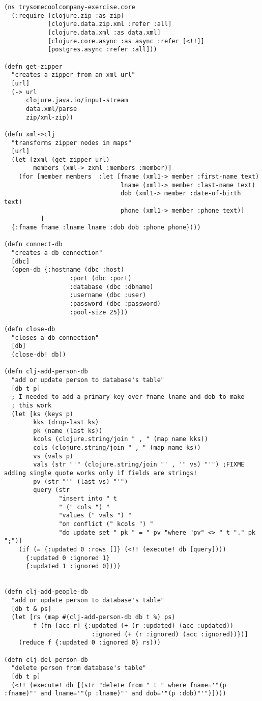 \documentclass[11pt]{article}
\begin{document}
\begin{verbatim}
(ns trysomecoolcompany-exercise.core
  (:require [clojure.zip :as zip]
            [clojure.data.zip.xml :refer :all]
            [clojure.data.xml :as data.xml]
            [clojure.core.async :as async :refer [<!!]]
            [postgres.async :refer :all]))

(defn get-zipper 
  "creates a zipper from an xml url"
  [url]
  (-> url
      clojure.java.io/input-stream
      data.xml/parse
      zip/xml-zip))

(defn xml->clj
  "transforms zipper nodes in maps"
  [url]
  (let [zxml (get-zipper url)
        members (xml-> zxml :members :member)]
    (for [member members  :let [fname (xml1-> member :first-name text)
                                lname (xml1-> member :last-name text)
                                dob (xml1-> member :date-of-birth text)
                                phone (xml1-> member :phone text)]
          ]
  {:fname fname :lname lname :dob dob :phone phone})))

(defn connect-db
  "creates a db connection"
  [dbc]
  (open-db {:hostname (dbc :host)
                  :port (dbc :port)
                  :database (dbc :dbname)
                  :username (dbc :user)
                  :password (dbc :password)
                  :pool-size 25}))

(defn close-db
  "closes a db connection"
  [db]
  (close-db! db))

(defn clj-add-person-db
  "add or update person to database's table"
  [db t p]
  ; I needed to add a primary key over fname lname and dob to make
  ; this work
  (let [ks (keys p)
        kks (drop-last ks)
        pk (name (last ks))
        kcols (clojure.string/join " , " (map name kks))        
        cols (clojure.string/join " , " (map name ks))
        vs (vals p)
        vals (str "'" (clojure.string/join "' , '" vs) "'") ;FIXME adding single quote works only if fields are strings!
        pv (str "'" (last vs) "'")
        query (str
               "insert into " t
               " (" cols ") "
               "values (" vals ") "
               "on conflict (" kcols ") "
               "do update set " pk " = " pv "where "pv" <> " t "." pk ";")]
    (if (= {:updated 0 :rows []} (<!! (execute! db [query])))
      {:updated 0 :ignored 1}
      {:updated 1 :ignored 0})))


(defn clj-add-people-db
  "add or update person to database's table"
  [db t & ps]
  (let [rs (map #(clj-add-person-db db t %) ps)
        f (fn [acc r] {:updated (+ (r :updated) (acc :updated))
                        :ignored (+ (r :ignored) (acc :ignored))})]
    (reduce f {:updated 0 :ignored 0} rs)))

(defn clj-del-person-db
  "delete person from database's table"
  [db t p]
  (<!! (execute! db [(str "delete from " t " where fname='"(p :fname)"' and lname='"(p :lname)"' and dob='"(p :dob)"'")])))
\end{verbatim}
\end{document}
